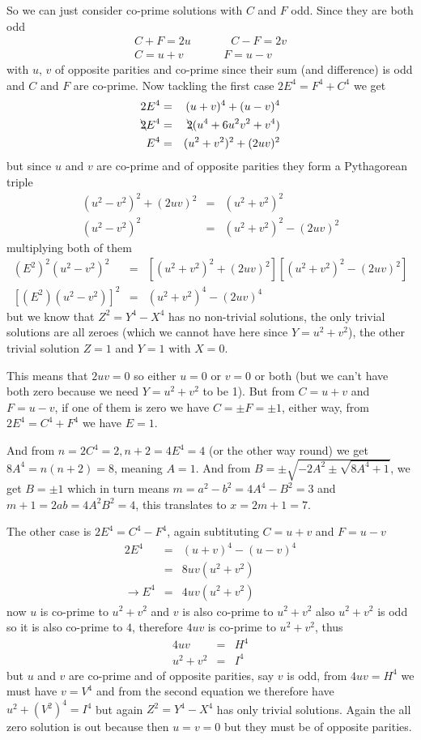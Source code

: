 \documentclass[aps,preprint,preprintnumbers,nofootinbib,showpacs,prd]{revtex4-1}
\newcommand{\nbea}{\begin{eqnarray*}}
\newcommand{\neea}{\end{eqnarray*}}
\begin{document}
So we can just consider co-prime solutions with $C$ and $F$ odd. Since they are both odd
%
\nbea
C + F = 2u  ~~~~~~~~~~~~~~~~ C - F = 2v \\
C = u + v    ~~~~~~~~~~~~~~~~ F = u - v
\neea
%
with $u$, $v$ of opposite parities and co-prime since their sum (and difference) is odd and $C$ and $F$ are co-prime. Now tackling the first case $2E^4 = F^4 + C^4$ we get
%
\nbea
2E^4 & = & (u + v)^4 + (u - v)^4 \\
\bcancel{2}E^4& = & \bcancel{2}(u^4 + 6u^2v^2 + v^4) \\
E^4 & = & (u^2 + v^2)^2 + (2uv)^2
\neea
%
but since $u$ and $v$ are co-prime and of opposite parities they form a Pythagorean triple
%
\nbea
(u^2 - v^2)^2 + (2uv)^2 & = & (u^2 + v^2)^2 \\
(u^2 - v^2)^2 & = & (u^2 + v^2)^2 - (2uv)^2
\neea
%
multiplying both of them
%
\nbea
(E^2)^2 (u^2 - v^2)^2 & = & \left \lbrack (u^2 + v^2)^2 + (2uv)^2 \right \rbrack \left \lbrack (u^2 + v^2)^2 - (2uv)^2 \right \rbrack \\
\left \lbrack (E^2) (u^2 - v^2) \right \rbrack^2 & = & (u^2 + v^2)^4 - (2uv)^4
\neea
%
but we know that $Z^2 = Y^4 - X^4$ has no non-trivial solutions, the only trivial solutions are all zeroes (which we cannot have here since $Y = u^2 + v^2$), the other trivial solution $Z = 1$ and $Y=1$ with $X = 0$.

This means that $2uv = 0$ so either $u=0$ or $v = 0$ or both (but we can't have both zero because we need $Y = u^2 + v^2$ to be 1). But from $C = u + v$ and $F = u - v$, if one of them is zero we have $C = \pm F = \pm 1$, either way, from $2E^4 = C^4 + F^4$ we have $E = 1$.

And from $n = 2C^4 = 2, n + 2 = 4E^4 = 4$ (or the other way round) we get $8A^4 = n(n+2) = 8$, meaning $A = 1$. And from $B = \pm \sqrt{-2A^2 \pm\sqrt{8A^4 + 1}}$, we get $B = \pm 1$ which in turn means $m = a^2 - b^2 = 4A^4 - B^2 = 3$ and $m + 1 = 2ab = 4A^2B^2 = 4$, this translates to $x = 2m+1 = 7$.

The other case is $2E^4 = C^4 - F^4$, again subtituting $C = u + v$ and $F = u-v$
%
\nbea
2E^4 & = & (u + v)^4 - (u - v)^4 \\
& = & 8uv(u^2 + v^2) \\
\to E^4 & = & 4uv(u^2 + v^2)
\neea
%
now $u$ is co-prime to $u^2 + v^2$ and $v$ is also co-prime to $u^2 + v^2$ also $u^2 + v^2$ is odd so it is also co-prime to $4$, therefore $4uv$ is co-prime to $u^2 + v^2$, thus
%
\nbea
4uv & = & H^4 \\
u^2 + v^2 & = & I^4
\neea
%
but $u$ and $v$ are co-prime and of opposite parities, say $v$ is odd, from $4uv = H^4$ we must have $v = V^4$ and from the second equation we therefore have $u^2 + (V^2)^4 = I^4$ but again $Z^2 = Y^4 - X^4$ has only trivial solutions. Again the all zero solution is out because then $u = v = 0$ but they must be of opposite parities.
\end{document}
